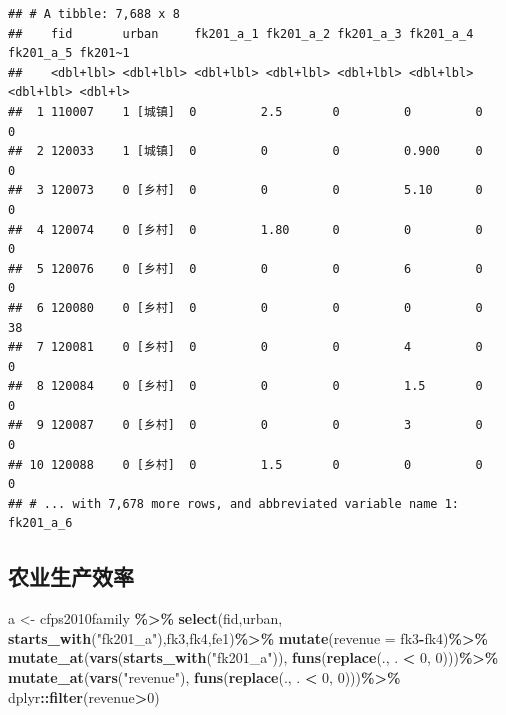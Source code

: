 \documentclass[
]{book}
\newenvironment{Shaded}{\begin{snugshade}}{\end{snugshade}}
\newcommand{\AttributeTok}[1]{\textcolor[rgb]{0.13,0.29,0.53}{#1}}
\newcommand{\DecValTok}[1]{\textcolor[rgb]{0.00,0.00,0.81}{#1}}
\newcommand{\FunctionTok}[1]{\textcolor[rgb]{0.13,0.29,0.53}{\textbf{#1}}}
\newcommand{\NormalTok}[1]{#1}
\newcommand{\OtherTok}[1]{\textcolor[rgb]{0.56,0.35,0.01}{#1}}
\newcommand{\SpecialCharTok}[1]{\textcolor[rgb]{0.81,0.36,0.00}{\textbf{#1}}}
\newcommand{\StringTok}[1]{\textcolor[rgb]{0.31,0.60,0.02}{#1}}
\begin{document}
\begin{verbatim}
## # A tibble: 7,688 x 8
##    fid       urban     fk201_a_1 fk201_a_2 fk201_a_3 fk201_a_4 fk201_a_5 fk201~1
##    <dbl+lbl> <dbl+lbl> <dbl+lbl> <dbl+lbl> <dbl+lbl> <dbl+lbl> <dbl+lbl> <dbl+l>
##  1 110007    1 [城镇]  0         2.5       0         0         0          0     
##  2 120033    1 [城镇]  0         0         0         0.900     0          0     
##  3 120073    0 [乡村]  0         0         0         5.10      0          0     
##  4 120074    0 [乡村]  0         1.80      0         0         0          0     
##  5 120076    0 [乡村]  0         0         0         6         0          0     
##  6 120080    0 [乡村]  0         0         0         0         0         38     
##  7 120081    0 [乡村]  0         0         0         4         0          0     
##  8 120084    0 [乡村]  0         0         0         1.5       0          0     
##  9 120087    0 [乡村]  0         0         0         3         0          0     
## 10 120088    0 [乡村]  0         1.5       0         0         0          0     
## # ... with 7,678 more rows, and abbreviated variable name 1: fk201_a_6
\end{verbatim}

\hypertarget{ux519cux4e1aux751fux4ea7ux6548ux7387}{%
\subsection{农业生产效率}\label{ux519cux4e1aux751fux4ea7ux6548ux7387}}

\begin{Shaded}
\begin{Highlighting}[]
\NormalTok{a }\OtherTok{\textless{}{-}}\NormalTok{ cfps2010family }\SpecialCharTok{\%\textgreater{}\%}
  \FunctionTok{select}\NormalTok{(fid,urban, }\FunctionTok{starts\_with}\NormalTok{(}\StringTok{"fk201\_a"}\NormalTok{),fk3,fk4,fe1)}\SpecialCharTok{\%\textgreater{}\%}
  \FunctionTok{mutate}\NormalTok{(}\AttributeTok{revenue =}\NormalTok{ fk3}\SpecialCharTok{{-}}\NormalTok{fk4)}\SpecialCharTok{\%\textgreater{}\%}
  \FunctionTok{mutate\_at}\NormalTok{(}\FunctionTok{vars}\NormalTok{(}\FunctionTok{starts\_with}\NormalTok{(}\StringTok{"fk201\_a"}\NormalTok{)), }\FunctionTok{funs}\NormalTok{(}\FunctionTok{replace}\NormalTok{(., . }\SpecialCharTok{\textless{}} \DecValTok{0}\NormalTok{, }\DecValTok{0}\NormalTok{)))}\SpecialCharTok{\%\textgreater{}\%}
  \FunctionTok{mutate\_at}\NormalTok{(}\FunctionTok{vars}\NormalTok{(}\StringTok{"revenue"}\NormalTok{), }\FunctionTok{funs}\NormalTok{(}\FunctionTok{replace}\NormalTok{(., . }\SpecialCharTok{\textless{}} \DecValTok{0}\NormalTok{, }\DecValTok{0}\NormalTok{)))}\SpecialCharTok{\%\textgreater{}\%}
\NormalTok{  dplyr}\SpecialCharTok{::}\FunctionTok{filter}\NormalTok{(revenue}\SpecialCharTok{\textgreater{}}\DecValTok{0}\NormalTok{)}
\end{Highlighting}
\end{Shaded}
\end{document}
